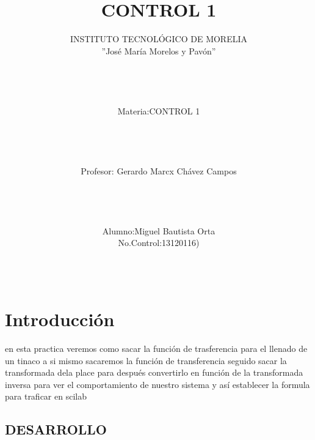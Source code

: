 \documentclass[12pt]{article}
\title{CONTROL 1}
\author{INSTITUTO TECNOLÓGICO DE MORELIA\\''José María Morelos y Pavón''\\ \\ \\ \\ \\Materia:CONTROL 1\\ \\ \\ \\ \\Profesor: Gerardo Marcx Chávez Campos\\ \\ \\ \\ \\Alumno:Miguel Bautista Orta\\No.Control:13120116)\\\\\\}
\begin{document}
\maketitle
\section{Introducción}
en esta practica veremos como sacar la función de trasferencia para el llenado de un tinaco a si mismo sacaremos la función de transferencia seguido  sacar la transformada dela place para después convertirlo en función de la transformada inversa para ver el comportamiento de nuestro sistema y así establecer la formula para traficar en scilab

\subsection{DESARROLLO}
\end{document}
